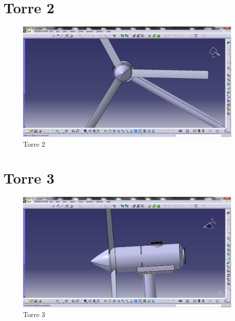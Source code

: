 \section{Torre 2}	
\begin{figure}[!htbp]
	  \centering
	  \includegraphics[scale=0.45]{editaveis/figuras/C_torre2}
	  \caption[Torre2]{Torre 2}
	  \label{Torre2}
	\end{figure}
	\FloatBarrier

\section{Torre 3}
\begin{figure}[!htbp]
	  \centering
	  \includegraphics[scale=0.45]{editaveis/figuras/C_torre3}
	  \caption[Torre3]{Torre 3}
	  \label{Torre3}
	\end{figure}
	\FloatBarrier

